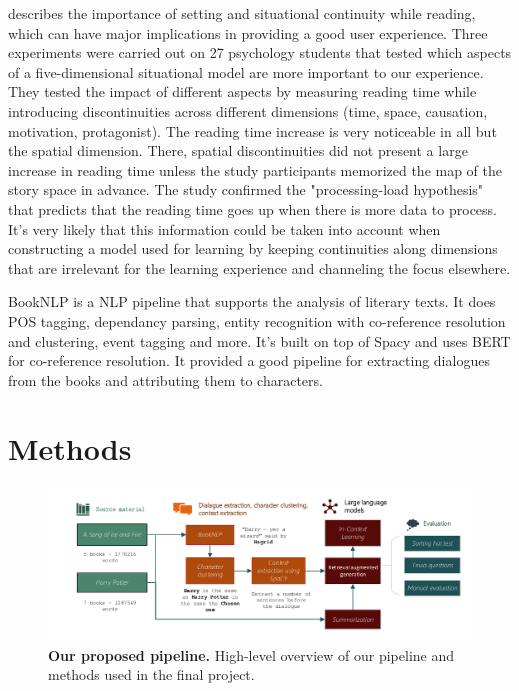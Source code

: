 \documentclass[fleqn,moreauthors,10pt]{ds_report}
\begin{document}
\cite{situation_models} describes the importance of setting and situational continuity while reading, which can have major implications in providing a good user experience.
Three experiments were carried out on 27 psychology students that tested which aspects of a five-dimensional situational model are more important to our experience.
They tested the impact of different aspects by measuring reading time while introducing discontinuities across different dimensions (time, space, causation, motivation, protagonist).
The reading time increase is very noticeable in all but the spatial dimension.
There, spatial discontinuities did not present a large increase in reading time unless the study participants memorized the map of the story space in advance.
The study confirmed the "processing-load hypothesis" that predicts that the reading time goes up when there is more data to process.
It's very likely that this information could be taken into account when constructing a model used for learning by keeping continuities along dimensions that are irrelevant for the learning experience and channeling the focus elsewhere.


BookNLP \cite{booknlp} is a NLP pipeline that supports the analysis of literary texts. It does POS tagging, dependancy parsing, entity recognition with co-reference resolution and clustering, event tagging and more. It's built on top of Spacy \cite{spacy2} and uses BERT \cite{joshi2019bert} for co-reference resolution. It provided a good pipeline for extracting dialogues from the books and attributing them to characters.


\section*{Methods}


\begin{figure}[htp]
	\centering
	\includegraphics[width=\linewidth]{pipeline.pdf}
	\caption{\textbf{Our proposed pipeline.} High-level overview of our pipeline and methods used in the final project.}
	\label{fig:pipeline}
\end{figure}
\end{document}

